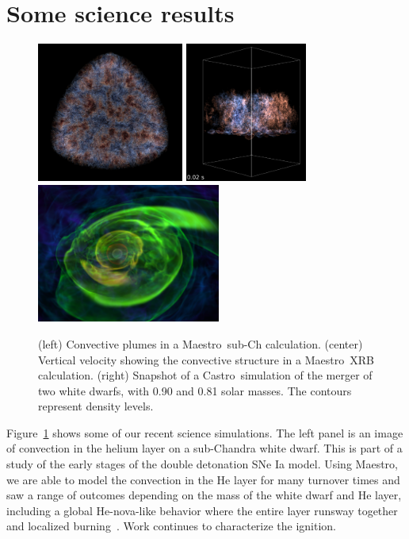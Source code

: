 \documentclass[a4paper]{jpconf}
\newcommand{\maestro}{{\sffamily Maestro}}
\newcommand{\castro}{{\sffamily Castro}}
\begin{document}
\section{Some science results}

\begin{figure}[t]
\centering \includegraphics[height=1.8in]{subch_h}
\includegraphics[height=1.8in]{xrb_compact}
\includegraphics[height=1.8in]{wdmerger_08030_new}
\caption{\label{fig:current-runs} (left) Convective plumes in a
  \maestro\ sub-Ch calculation. (center) Vertical velocity showing the
  convective structure in a \maestro\ XRB calculation. (right)
  Snapshot of a \castro\ simulation of the merger of two white dwarfs,
  with 0.90 and 0.81 solar masses. The contours represent density
  levels.}
\end{figure}

Figure~\ref{fig:current-runs} shows some of our recent science
simulations.  The left panel is an image of convection in the helium
layer on a sub-Chandra white dwarf.  This is part of a study of the
early stages of the double detonation SNe Ia model.  Using \maestro,
we are able to model the convection in the He layer for many turnover
times and saw a range of outcomes depending on the mass of the white
dwarf and He layer, including a global He-nova-like behavior where the
entire layer runsway together and localized
burning~\cite{subchandra2}.  Work continues to characterize the ignition.
\end{document}

